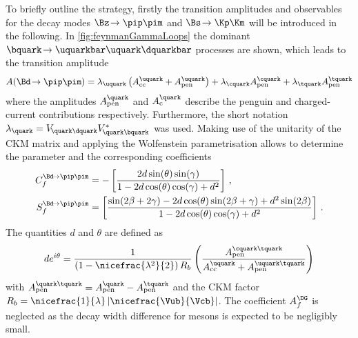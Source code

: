 To briefly outline the strategy, firstly the transition amplitudes and \CP observables for the decay modes $\Bz\!\to\pip\pim$ and $\Bs\!\to\Kp\Km$ will be introduced in the following.
In \cref{fig:feynmanGammaLoops} the dominant $\bquark\!\to\uquarkbar\uquark\dquarkbar$ processes are shown, which leads to the transition amplitude
\begin{equation}
A\!\left(\Bd\!\to\pip\pim\right)=\lambda_\uquark\left(A_{\text{cc}}^\uquark+A_{\text{pen}}^\uquark\right)+\lambda_\cquark A_{\text{pen}}^\cquark+\lambda_\tquark A_{\text{pen}}^\tquark
\end{equation}
where the amplitudes $A_{\text{pen}}^\quark$ and $A_{\text{c}}^\quark$ describe the penguin and charged-current contributions respectively.
Furthermore, the short notation $\lambda_\quark=V_{{\kern -0.1em}\quark\dquark}V^{*}_{{\kern -0.1em}\quark\bquark}$ was used.
Making use of the unitarity of the CKM matrix and applying the Wolfenstein parametrisation \cite{Wolfenstein:1983yz} allows to determine the parameter \Lf and the corresponding \CP coefficients
\begin{equation}
\begin{aligned}
C_{f}^{\Bd\!\to\pip\pim}&=-\left[\frac{2d\sin\!\left(\theta\right)\sin\!\left(\gamma\right)}{1-2d\cos\!\left(\theta\right)\cos\!\left(\gamma\right)+d^2}\right]\,,\\
S_{f}^{\Bd\!\to\pip\pim}&=\left[\frac{\sin\!\left(2\beta+2\gamma\right)-2d\cos\!\left(\theta\right)\sin\!\left(2\beta+\gamma\right)+d^2\sin\!\left(2\beta\right)}{1-2d\cos\!\left(\theta\right)\cos\!\left(\gamma\right)+d^2}\right]\,.
\end{aligned}
\end{equation}
The quantities $d$ and $\theta$ are defined as
\begin{equation}
de^{i\theta}=\frac{1}{\left(1-\nicefrac{\lambda^2}{2}\right)R_b}\left(\frac{A_{\text{pen}}^{\cquark\tquark}}{A_{\text{cc}}^{\uquark}+A_{\text{pen}}^{\uquark\tquark}}\right)
\end{equation}
with $A_{\text{pen}}^{\quark\tquark}=A_{\text{pen}}^{\quark}-A_{\text{pen}}^{\tquark}$ and the CKM factor $R_b=\nicefrac{1}{\lambda}\left|\nicefrac{\Vub}{\Vcb}\right|$.
The \CP coefficient $A_f^{\DG}$ is neglected as the decay width difference for \Bd mesons is expected to be negligibly small.

